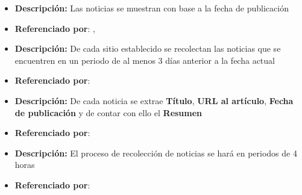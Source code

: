 
\begin{itemize}
  \item \textbf{Descripción:} Las noticias se muestran con base a la fecha de publicación
  \item \textbf{Referenciado por}: , \\
\end{itemize}


\begin{itemize}
  \item \textbf{Descripción:} De cada sitio establecido se recolectan las noticias que se encuentren en un periodo de al menos 3 días anterior a la fecha actual
  \item \textbf{Referenciado por}:  \\
\end{itemize}


\begin{itemize}
  \item \textbf{Descripción:} De cada noticia se extrae \textbf{Título}, \textbf{URL al artículo}, \textbf{Fecha de publicación} y de contar con ello el \textbf{Resumen}

  \item \textbf{Referenciado por}: \\
\end{itemize}



\begin{itemize}
  \item \textbf{Descripción:} El proceso de recolección de noticias se hará en periodos de 4 horas 

  \item \textbf{Referenciado por}: \\
\end{itemize}

